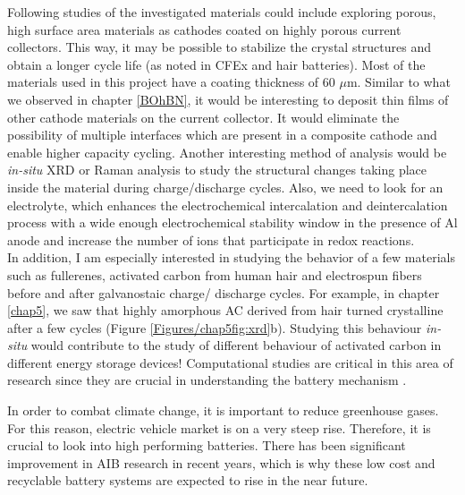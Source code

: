 Following studies of the investigated materials could include exploring porous, high surface area materials as cathodes coated on highly porous current collectors. This way, it may be possible to stabilize the crystal structures and obtain a longer cycle life (as noted in CFEx and hair batteries). Most of the materials used in this project have a coating thickness of 60 $\mu$m. Similar to what we observed in chapter \ref{BOhBN}, it would be interesting to deposit thin films of other cathode materials on the current collector. It would eliminate the possibility of multiple interfaces which are present in a composite cathode and enable higher capacity cycling. Another interesting method of analysis would be \textit{in-situ} XRD or Raman analysis to study the structural changes taking place inside the material during charge/discharge cycles. Also, we need to look for an electrolyte, which enhances the electrochemical intercalation and deintercalation process with a wide enough electrochemical stability window in the presence of Al anode \cite{jayaprakash_rechargeable_2011} and increase the number of ions that participate in redox reactions.\\
In addition, I am especially interested in studying the behavior of a few materials such as fullerenes, activated carbon from human hair and electrospun  fibers before and after galvanostaic charge/ discharge cycles. For example, in chapter \ref{chap5}, we saw that highly amorphous AC derived from hair turned crystalline after a few cycles (Figure \ref{Figures/chap5fig:xrd}b). Studying this behaviour \textit{in-situ} would contribute to the study of different behaviour of activated carbon in different energy storage devices! Computational studies are critical in this area of research since they are crucial in understanding the battery mechanism \cite{bhauriyal_computational_2017,gao_understanding_2017-1,bhauriyal_staging_2017-1,agiorgousis_role_2017}. 

In order to combat climate change, it is important to reduce greenhouse gases. For this reason, electric vehicle market is on a very steep rise. Therefore, it is crucial to look into high performing batteries. There has been significant improvement in AIB research in
recent years, which is why these low cost and recyclable battery systems are expected to rise in the near future.